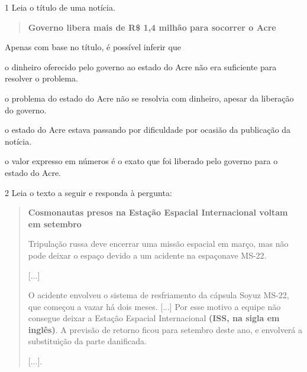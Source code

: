 \pagebreak
\pagestyle{simu}

\num{1} Leia o título de uma notícia.

\begin{quote}
\textbf{Governo libera mais de R\$ 1,4 milhão para socorrer o Acre}

\end{quote}

Apenas com base no título, é possível inferir que

\begin{escolha}
\item o dinheiro oferecido pelo governo ao estado do Acre não era suficiente para resolver o problema.

\item o problema do estado do Acre não se resolvia com dinheiro, apesar da liberação do governo.

\item o estado do Acre estava passando por dificuldade por ocasião da publicação da notícia.

\item o valor expresso em números é o exato que foi liberado pelo governo para o estado do Acre.
\end{escolha}


\num{2} Leia o texto a seguir e responda à pergunta:

\begin{quote}
\textbf{Cosmonautas presos na Estação Espacial Internacional voltam em
setembro}

Tripulação russa deve encerrar uma missão espacial em março, mas não
pode deixar o espaço devido a um acidente na espaçonave MS-22.

{[}...{]}

O acidente envolveu o sistema de resfriamento da cápsula Soyuz MS-22,
que começou a vazar há dois meses. {[}...{]} Por esse motivo a equipe
não consegue deixar a Estação Espacial Internacional \textbf{(ISS, na
sigla em inglês)}. A previsão de retorno ficou para setembro deste ano,
e envolverá a substituição da parte danificada.

{[}...{]}.

\end{quote}

